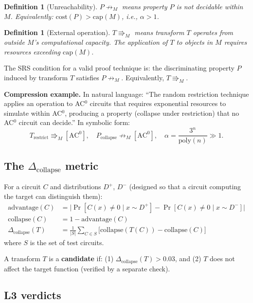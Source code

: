 \documentclass[11pt,a4paper]{article}
\newtheorem{definition}[theorem]{Definition}
\newcommand{\unreachM}{\not\rightarrow_M}     %
\newcommand{\extop}{\Rrightarrow_M}           %
\newcommand{\Dcollapse}{\Delta_{\mathrm{collapse}}}
\begin{document}
\begin{definition}[Unreachability]
$P \unreachM$ means property $P$ is not decidable within $M$. Equivalently: $\mathrm{cost}(P) > \mathrm{cap}(M)$, i.e., $\alpha > 1$.
\end{definition}

\begin{definition}[External operation]
$T \extop$ means transform $T$ operates from outside $M$'s computational capacity. The application of $T$ to objects in $M$ requires resources exceeding $\mathrm{cap}(M)$.
\end{definition}

The SRS condition for a valid proof technique is: the discriminating property $P$ induced by transform $T$ satisfies $P \unreachM$. Equivalently, $T \extop$.

\textbf{Compression example.} In natural language: ``The random restriction technique applies an operation to AC$^0$ circuits that requires exponential resources to simulate within AC$^0$, producing a property (collapse under restriction) that no AC$^0$ circuit can decide.'' In symbolic form:
\[
T_{\mathrm{restrict}} \extop[\mathrm{AC}^0], \quad P_{\mathrm{collapse}} \unreachM[\mathrm{AC}^0], \quad \alpha = \frac{3^n}{\mathrm{poly}(n)} \gg 1.
\]

\subsection{The $\Dcollapse$ metric}

For a circuit $C$ and distributions $D^+$, $D^-$ (designed so that a circuit computing the target can distinguish them):
\begin{align}
\mathrm{advantage}(C) &= \bigl|\Pr[C(x) \neq 0 \mid x \sim D^+] - \Pr[C(x) \neq 0 \mid x \sim D^-]\bigr| \\
\mathrm{collapse}(C) &= 1 - \mathrm{advantage}(C) \\
\Dcollapse(T) &= \frac{1}{|S|}\sum_{C \in S}\bigl[\mathrm{collapse}(T(C)) - \mathrm{collapse}(C)\bigr]
\end{align}
where $S$ is the set of test circuits.

A transform $T$ is a \textbf{candidate} if: (1) $\Dcollapse(T) > 0.03$, and (2) $T$ does not affect the target function (verified by a separate check).

\subsection{L3 verdicts}
\end{document}
